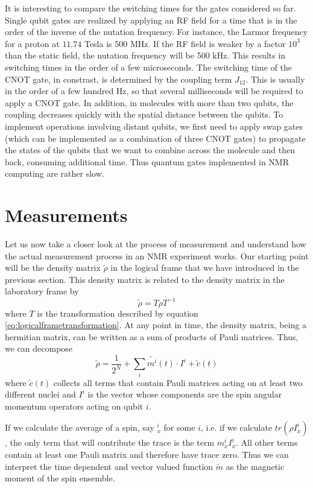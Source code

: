 \documentclass[a4paper, draft]{article}
\theoremstyle{own}
\theoremstyle{remark}
\begin{document}
It is interesting to compare the switching times for the gates considered so far. Single qubit gates are realized by applying an RF field for a time that is in the order of the inverse of the nutation frequency. For instance, the Larmor frequency for a proton at $11.74$ Tesla is 500 MHz. If the RF field is weaker by a factor $10^3$ than the static field, the nutation frequency will be 500 kHz. This results in switching times in the order of a few microseconds. The switching time of the CNOT gate, in constrast, is determined by the coupling term $J_{12}$. This is usually in the order of a few hundred Hz, so that several milliseconds will be required to apply a CNOT gate. In addition, in molecules with more than two qubits, the coupling decreases quickly with the spatial distance between the qubits. To implement operations involving distant qubits, we first need to apply swap gates (which can be implemented as a combination of three CNOT gates) to propagate the states of the qubits that we want to combine across the molecule and then back, consuming additional time. Thus quantum gates implemented in NMR computing are rather slow. 


\section{Measurements}\label{sec:measurements}

Let us now take a closer look at the process of measurement and understand how the actual measurement process in an NMR experiment works. Our starting point will be the density matrix $\widetilde{\rho}$ in the logical frame that we have introduced in the previous section. This density matrix is related to the density matrix in the laboratory frame by
$$
\widetilde{\rho} = T \rho T^{-1}
$$
where $T$ is the transformation described by equation \eqref{eq:logicalframetransformation}. At any point in time, the density matrix, being a hermitian matrix, can be written as a sum of products of Pauli matrices. Thus, we can decompose
$$
\widetilde{\rho} = \frac{1}{2^N} + \sum_i \widetilde{m^i}(t) \cdot I^i + \widetilde{c}(t)
$$
where $\widetilde{c}(t)$ collects all terms that contain Pauli matrices acting on at least two different nuclei and $I^i$ is the vector whose components are the spin angular momentum operators acting on qubit $i$. 

If we calculate the average of a spin, say $_x^i$ for some $i$, i.e. if we calculate $tr(\rho I_x^i)$, the only term that will contribute the trace is the term $m^i_x I_x^i$. All other terms contain at least one Pauli matrix and therefore have trace zero. Thus we can interpret the time dependent and vector valued function $\widetilde{m}$ as the magnetic moment of the spin ensemble. 
\end{document}
